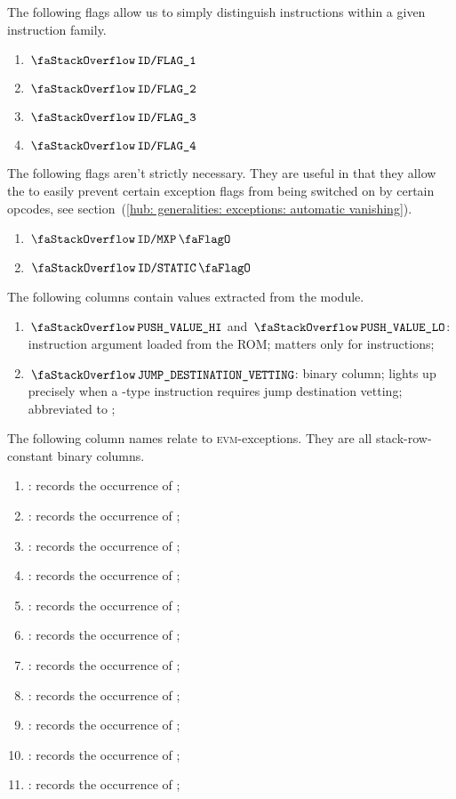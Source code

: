 The following flags allow us to simply distinguish instructions within a given instruction family.
\begin{multicols}{4}
	\begin{enumerate}[resume]
		\item $\decFlag{1}$
		\item $\decFlag{2}$
		\item $\decFlag{3}$
		\item $\decFlag{4}$
	\end{enumerate}
\end{multicols}
The following flags aren't strictly necessary.
They are useful in that they allow the \zkEvm{} to easily prevent certain exception flags from being switched on by certain opcodes, see section~(\ref{hub: generalities: exceptions: automatic vanishing}).
\begin{multicols}{2}
	\begin{enumerate}[resume]
		\item $\stackDecMxpFlag$
		\item $\stackDecStaticFlag$
	\end{enumerate}
\end{multicols}
The following columns contain values extracted from the \romMod{} module.
\begin{enumerate}[resume]
	\item $\stackPushParamHi$ and $\stackPushParamLo$:
		instruction argument loaded from the ROM; matters only for  instructions;
	\item $\stackJUMPDESTINATIONVETTING$:
		binary column; lights up precisely when a -type instruction requires jump destination vetting; abbreviated to \stackJumpDestinationVetting{};
\end{enumerate}
The following column names relate to \textsc{evm}-exceptions.
They are all stack-row-constant binary columns.
\begin{enumerate}[resume]
	\item \stackOpcx{}:
		records the occurrence of \opcxSH{};
	\item \stackSux{}:
		records the occurrence of \suxSH{};
	\item \stackSox{}:
		records the occurrence of \soxSH{};
	\item \stackMxpx{}:
		records the occurrence of \mxpxSH{};
	\item \stackOogx{}:
		records the occurrence of \oogxSH{};
	\item \stackRdcx{}:
		records the occurrence of \rdcxSH{};
	\item \stackJumpx{}:
		records the occurrence of \jumpxSH{};
	\item \stackStaticx{}:
		records the occurrence of \staticxSH{};
	\item \stackSstorex{}:
		records the occurrence of \sstorexSH{};
	\item \stackIcpx{}:
		records the occurrence of \icpxSH{};
	\item \stackMaxcsx{}:
		records the occurrence of \maxcsxSH{};
\end{enumerate}
